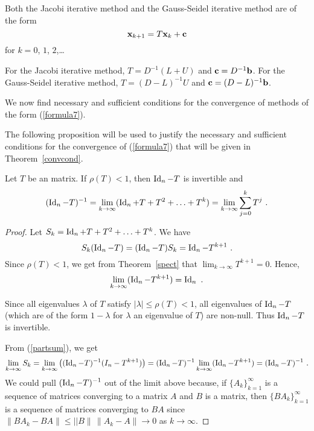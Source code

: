 Both the Jacobi iterative method and the Gauss-Seidel iterative
method are of the form
\begin{equation} \label{formula7}
\mathbf{x}_{k+1} = T \mathbf{x}_{k} + \mathbf{c}
\end{equation}
for $k=0$, $1$, $2$,\ldots

For the Jacobi iterative method, $T = D^{-1}(L + U)$ and
$\mathbf{c} = D^{-1}\mathbf{b}$.  For the Gauss-Seidel iterative method,
$T = (D-L)^{-1} U$ and $\mathbf{c} = (D-L)^{-1}\mathbf{b}$.

We now find necessary and sufficient conditions for the convergence of
methods of the form (\ref{formula7}).

The following proposition will be used to justify the necessary and
sufficient conditions for the convergence of (\ref{formula7}) that
will be given in Theorem~\ref{convcond}.

\begin{prop}
Let $T$ be an \nn matrix.  If $\rho(T) < 1$, then $\operatorname{Id}_n - T$ is
invertible and
\[
(\operatorname{Id}_n-T)^{-1}
= \lim_{k\rightarrow \infty} (\operatorname{Id}_n + T + T^2 + \ldots + T^k)
= \lim_{k\rightarrow \infty} \sum_{j=0}^k T^j \ .
\]
\label{Banach}
\end{prop}

\begin{proof}
Let $S_k = \operatorname{Id}_n + T + T^2 + \ldots + T^k$.  We have
\begin{equation}\label{partsum}
S_k(\operatorname{Id}_n-T) = (\operatorname{Id}_n-T)S_k = \operatorname{Id}_n - T^{k+1} \ .
\end{equation}
Since $\rho(T) < 1$, we get from Theorem~\ref{spect} that
$\displaystyle \lim_{k\rightarrow \infty} T^{k+1} = 0$.  Hence,
\[
\lim_{k\rightarrow \infty} (\operatorname{Id}_n - T^{k+1}) = \operatorname{Id}_n \ .
\]

Since all eigenvalues $\lambda$ of $T$ satisfy
$|\lambda| \leq \rho(T) < 1$, all eigenvalues of $\operatorname{Id}_n-T$ (which
are of the form $1-\lambda$ for $\lambda$ an eigenvalue of $T$) are
non-null.  Thus $\operatorname{Id}_n-T$ is invertible.

From (\ref{partsum}), we get
\[
\lim_{k\rightarrow\infty} S_k = \lim_{k\rightarrow\infty}
\left( (\operatorname{Id}_n-T)^{-1} (I_n-T^{k+1}) \right) =
(\operatorname{Id}_n-T)^{-1} \lim_{k\rightarrow \infty} (\operatorname{Id}_n-T^{k+1}) =
(\operatorname{Id}_n-T)^{-1} \ .
\]
We could pull $\displaystyle (\operatorname{Id}_n-T)^{-1}$ out of the limit above
because, if $\displaystyle \{A_k\}_{k=1}^\infty$ is a sequence of \nn
matrices converging to a matrix $A$ and $B$ is a \nn matrix, then
$\displaystyle \{B A_k\}_{k=1}^\infty$ is a sequence of \nn matrices
converging to $BA$ since
$\|BA_k- BA \| \leq ||B \|\,\|A_k - A\| \to 0$ as $k \to \infty$.
\end{proof}


